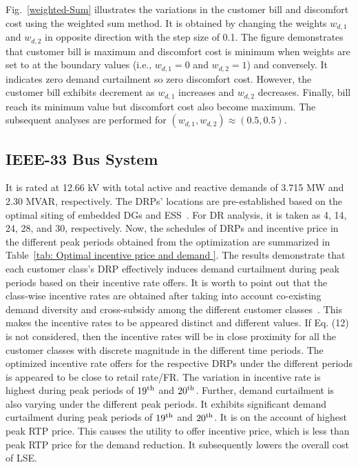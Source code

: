 \documentclass[journal]{IEEEtran}
\begin{document}
Fig.~\mbox{\ref{weighted-Sum}} illustrates the variations in the customer bill and discomfort cost using the weighted sum method. It is obtained by changing the weights $w_{d,1}$ and $w_{d,2}$ in opposite direction with the step size of 0.1. The figure demonstrates that customer bill is maximum and discomfort cost is minimum when weights are set to at the boundary values (i.e., $w_{d,1}=0$ and $w_{d,2}=1$) and conversely. It indicates zero demand curtailment so zero discomfort cost. However, the customer bill exhibits decrement as $w_{d,1}$ increases and $w_{d,2}$ decreases. 
	Finally, bill reach its minimum value but discomfort cost also become maximum.
The subsequent analyses are performed for $(w_{d,1},w_{d,2})\approx (0.5,0.5)$. 
\vspace{-1mm}
\subsection{IEEE-33 Bus System}
It is rated at 12.66 kV with total active and reactive demands of 3.715 MW and 2.30 MVAR, respectively. The DRPs' locations are pre-established based on the optimal siting of embedded DGs and ESS~\cite{meena2018optimal}. For DR analysis, it is taken as 4, 14, 24, 28, and 30, respectively. Now, the schedules of DRPs and incentive price in the different peak periods obtained from the optimization are summarized in Table~\ref{tab: Optimal incentive price and demand }. The results demonstrate that each customer class’s DRP effectively induces demand curtailment during peak periods based on their incentive rate offers. It is worth to point out that the class-wise incentive rates are obtained after taking into account co-existing demand diversity and cross-subsidy among the different customer classes~\cite{faruqui2012ethics}. This makes the incentive rates to be appeared distinct and different values. If Eq. (12) is not considered, then the incentive rates will be in close proximity for all the customer classes with discrete magnitude in the different time periods. The optimized incentive rate offers for the respective DRPs under the different periods is appeared to be close to retail rate/FR. The variation in incentive rate is highest during peak periods of $\rm{19}^{\rm{th}}$ and $\rm{20}^{\rm{th}}$. Further, demand curtailment is also varying under the different peak periods. It exhibits significant demand curtailment during peak periods of $\rm{19}^{\rm{th}}$ and $\rm{20}^{\rm{th}}$. It is on the account of highest peak RTP price. This causes the utility to offer incentive price, which is less than peak RTP price for the demand reduction. It subsequently lowers the overall cost of LSE.
\end{document}
